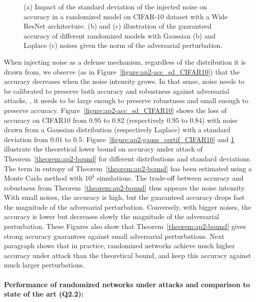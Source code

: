 \begin{figure}[htb]
\begin{subfigure}[t]{0.31\textwidth}
      \caption{}
      \label{figure:ap2-laplace_certif_CIFAR10}
  \end{subfigure}
  \caption{(a) Impact of the standard deviation of the injected noise on accuracy in a randomized model on CIFAR-10 dataset with a Wide ResNet architecture. (b) and (c) illustration of the guaranteed accuracy of different randomized models with Gaussian (b) and Laplace (c) noises given the norm of the adversarial perturbation.}
  \label{figure:ap2-cifar10_results}
\end{figure}

When injecting noise as a defense mechanism, regardless of the distribution it is drawn from, we observe (as in Figure~\ref{figure:ap2-acc_sd_CIFAR10}) that the accuracy decreases when the noise intensity grows.
In that sense, noise needs to be calibrated to preserve both accuracy and robustness against adversarial attacks, \ie, it needs to be large enough to preserve robustness and small enough to preserve accuracy.
Figure~\ref{figure:ap2-acc_sd_CIFAR10} shows the loss of accuracy on CIFAR10 from $0.95$ to $0.82$ (respectively $0.95$ to $0.84$) with noise drawn from a Gaussian distribution (respectively Laplace) with a standard deviation from $0.01$ to $0.5$.
Figure~\ref{figure:ap2-gauss_certif_CIFAR10} and \ref{figure:ap2-laplace_certif_CIFAR10} illustrate the theoretical lower bound on accuracy under attack of Theorem~\ref{theorem:ap2-bound} for different distributions and standard deviations.
The term in entropy of Theorem~\ref{theorem:ap2-bound} has been estimated using a Monte Carlo method with $10^4$ simulations.
The trade-off between accuracy and robustness from Theorem~\ref{theorem:ap2-bound} thus appears \wrt the noise intensity.
With small noises, the accuracy is high, but the guaranteed accuracy drops fast \wrt the magnitude of the adversarial perturbation.
Conversely, with bigger noises, the accuracy is lower but decreases slowly \wrt the magnitude of the adversarial perturbation.
These Figures also show that Theorem~\ref{theorem:ap2-bound} gives strong accuracy guarantees against small adversarial perturbations.
Next paragraph shows that in practice, randomized networks achieve much higher accuracy under attack than the theoretical bound, and keep this accuracy against much larger perturbations.


\paragraph{Performance of randomized networks under attacks and comparison to state of the art (Q2.2):}
\label{sec:perf_under_attack}

